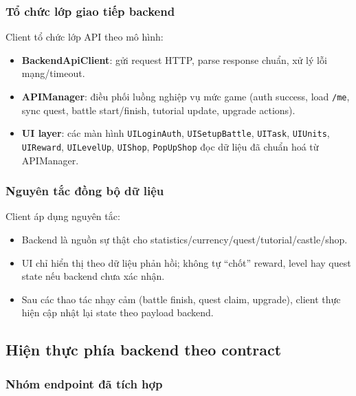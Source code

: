 \subsubsection{Tổ chức lớp giao tiếp backend}
\label{subsubsec:impl-client-api}

Client tổ chức lớp API theo mô hình:
\begin{itemize}
    \item \textbf{BackendApiClient}: gửi request HTTP, parse response chuẩn, xử lý lỗi mạng/\allowbreak timeout.
    \item \textbf{APIManager}: điều phối luồng nghiệp vụ mức game (auth success, load \texttt{/me}, sync quest, battle start/\allowbreak finish, tutorial update, upgrade actions).
    \item \textbf{UI layer}: các màn hình \texttt{UILoginAuth}, \texttt{UISetupBattle}, \texttt{UITask}, \texttt{UIUnits}, \texttt{UIReward}, \texttt{UILevelUp}, \texttt{UIShop}, \texttt{PopUpShop} đọc dữ liệu đã chuẩn hoá từ APIManager.
\end{itemize}

\subsubsection{Nguyên tắc đồng bộ dữ liệu}
\label{subsubsec:impl-client-sync}

Client áp dụng nguyên tắc:
\begin{itemize}
    \item Backend là nguồn sự thật cho statistics/\allowbreak currency/\allowbreak quest/\allowbreak tutorial/\allowbreak castle/\allowbreak shop.
    \item UI chỉ hiển thị theo dữ liệu phản hồi; không tự ``chốt'' reward, level hay quest state nếu backend chưa xác nhận.
    \item Sau các thao tác nhạy cảm (battle finish, quest claim, upgrade), client thực hiện cập nhật lại state theo payload backend.
\end{itemize}

\subsection{Hiện thực phía backend theo contract}
\label{subsec:impl-server}

\subsubsection{Nhóm endpoint đã tích hợp}
\label{subsubsec:impl-server-endpoints}

